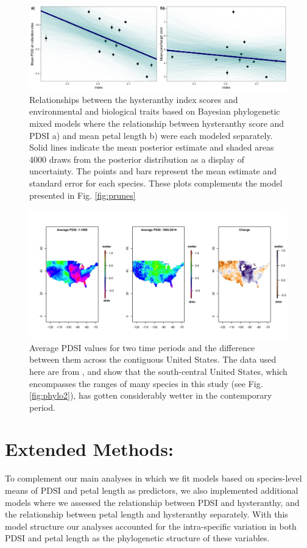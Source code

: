 \documentclass{article}[11pt]
\begin{document}
\begin{figure}[h!]
    \centering
 \includegraphics[width=.95\textwidth]{..//..//Plots/dataplots_SUPP.jpeg}
    \caption{Relationships between the hysteranthy index scores and environmental and biological traits based on Bayesian phylogenetic mixed models where the relationship between hysteranthy score and PDSI a)  and mean petal length b)  were each modeled separately. Solid lines indicate the mean posterior estimate and shaded areas 4000 draws from the posterior distribution as a display of uncertainty. The points and bars represent the mean estimate and standard error for each species. These plots complements the model presented in Fig. \ref{fig:prunes}}
    \label{fig:seps}
\end{figure}

\begin{figure}[h!]
    \centering
 \includegraphics[width=\textwidth]{..//..//Plots/PDSIovertimemaps.jpeg}
    \caption{Average PDSI values for two time periods and the difference between them across the contiguous United States. The data used here are from \citet{Gile_2017}, and show that the south-central United States, which encompasses the ranges of many species in this study (see Fig. \ref{fig:phylo2}), has gotten considerably wetter in the contemporary period.}
    \label{fig:timeschange}
\end{figure}

\pagebreak

\section*{Extended Methods:}
To complement our main analyses in which we fit models based on species-level means of PDSI and petal length as predictors, we also implemented additional models where we assessed the relationship between PDSI and hysteranthy, and the relationship between petal length and hysteranthy separately. With this model structure our analyses accounted for the intra-specific variation in both PDSI and petal length as the phylogenetic structure of these variables.
\end{document}
